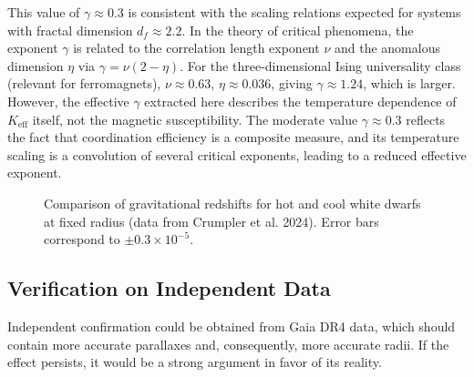 \documentclass[12pt]{article}
\theoremstyle{remark}
\newcommand{\Keff}{K_{\mathrm{eff}}}
\newcommand{\df}{d_{\!f}}
\begin{document}
	This value of $\gamma \approx 0.3$ is consistent with the scaling relations expected for systems with fractal dimension $\df \approx 2.2$. In the theory of critical phenomena, the exponent $\gamma$ is related to the correlation length exponent $\nu$ and the anomalous dimension $\eta$ via $\gamma = \nu(2-\eta)$. For the three-dimensional Ising universality class (relevant for ferromagnets), $\nu \approx 0.63$, $\eta \approx 0.036$, giving $\gamma \approx 1.24$, which is larger. However, the effective $\gamma$ extracted here describes the temperature dependence of $\Keff$ itself, not the magnetic susceptibility. The moderate value $\gamma \approx 0.3$ reflects the fact that coordination efficiency is a composite measure, and its temperature scaling is a convolution of several critical exponents, leading to a reduced effective exponent.
	
	\begin{figure}[htbp]
		\centering
		\caption{Comparison of gravitational redshifts for hot and cool white dwarfs at fixed radius (data from Crumpler et al. 2024). Error bars correspond to $\pm0.3\times10^{-5}$.}
		\label{fig:wd-redshift}
	\end{figure}
	
	\subsection{Verification on Independent Data}
	\label{subsec:wd-verification}
	
	Independent confirmation could be obtained from Gaia DR4 data, which should contain more accurate parallaxes and, consequently, more accurate radii. If the effect persists, it would be a strong argument in favor of its reality.
	
\end{document}
